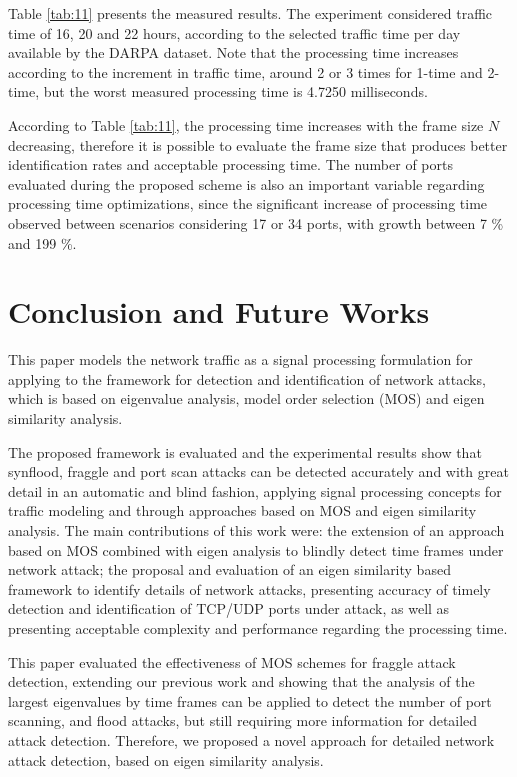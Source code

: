 Table \ref{tab:11} presents the measured results. The experiment considered traffic time of 16, 20 and 22 hours, according to the selected traffic time per day available by the DARPA dataset. Note that the processing time increases according to the increment in traffic time, around 2 or 3 times for 1-time and 2-time, but the worst measured processing time is 4.7250 milliseconds.

According to Table \ref{tab:11}, the processing time increases with the frame size $N$ decreasing, therefore it is possible to evaluate the frame size that produces better identification rates and acceptable processing time. The number of ports evaluated during the proposed scheme is also an important variable regarding processing time optimizations, since the significant increase of processing time observed between scenarios considering 17 or 34 ports, with growth between 7 \% and 199 \%.


\section{Conclusion and Future Works}
\label{sec:2_conclusionandfutureworks}

This paper models the network traffic as a signal processing formulation for applying to the framework for detection and identification of network attacks, which is based on eigenvalue analysis, model order selection (MOS) and eigen similarity analysis.

The proposed framework is evaluated and the experimental results show that synflood, fraggle and port scan attacks can be detected accurately and with great detail in an automatic and blind fashion, applying signal processing concepts for traffic modeling and through approaches based on MOS and eigen similarity analysis. The main contributions of this work were: the extension of an approach based on MOS combined with eigen analysis to blindly detect time frames under network attack; the proposal and evaluation of an eigen similarity based framework to identify details of network attacks, presenting accuracy of timely detection and identification of TCP/UDP ports under attack, as well as presenting acceptable complexity and performance regarding the processing time.

This paper evaluated the effectiveness of MOS schemes for fraggle attack detection, extending our previous work \cite{tenorio2013greatest} and showing that the analysis of the largest eigenvalues by time frames can be applied to detect the number of port scanning, and flood attacks, but still requiring more information for detailed attack detection. Therefore, we proposed a novel approach for detailed network attack detection, based on eigen similarity analysis.

